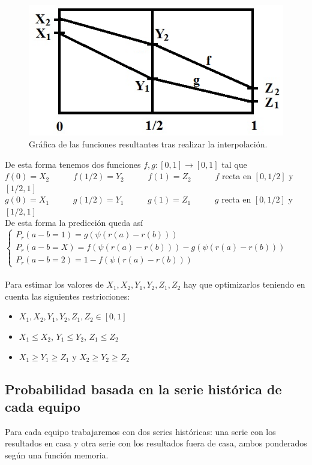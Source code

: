 \begin{figure}[htb]
	\centering
	\includegraphics{images/interpolar.png}
	\caption{Gráfica de las funciones resultantes tras realizar la interpolación.} \label{fig:interpolar}
\end{figure}

De esta forma tenemos dos funciones $f,g:[0,1] \longrightarrow [0,1]$ tal que\\
$f(0)= X_{2}$ \ \ \ \ \ $f(1/2)= Y_{2}$ \ \ \ \ \ $f(1)= Z_{2}$ \ \ \ \ \ $f$ recta en $[0,1/2]$ y $[1/2,1]$\\
$g(0)= X_{1}$ \ \ \ \ \ $g(1/2)= Y_{1}$ \ \ \ \ \ $g(1)= Z_{1}$ \ \ \ \ \ $g$ recta en $[0,1/2]$ y $[1/2,1]$\\

De esta forma la predicción queda así\\

$\begin{cases}
	P_{r}(a-b=1)=g(\psi (r(a)-r(b)))\\
	P_{r}(a-b=X)=f(\psi (r(a)-r(b)))-g(\psi (r(a)-r(b)))\\
	P_{r}(a-b=2)=1-f(\psi (r(a)-r(b)))
\end{cases}$
\ \\
\ \\
Para estimar los valores de $X_{1},X_{2},Y_{1},Y_{2},Z_{1},Z_{2}$ hay que optimizarlos teniendo en cuenta las siguientes restricciones:
\begin{itemize}
	\item $X_{1},X_{2},Y_{1},Y_{2},Z_{1},Z_{2} \in [0,1]$
	\item $X_{1} \leq X_{2}$, $Y_{1} \leq Y_{2}$, $Z_{1} \leq Z_{2}$
	\item $X_{1} \geq Y_{1} \geq Z_{1}$ y $X_{2} \geq Y_{2} \geq Z_{2}$	
\end{itemize}

\subsection{Probabilidad basada en la serie histórica de cada equipo}
Para cada equipo trabajaremos con dos series históricas: una serie con los resultados en casa y otra serie con los resultados fuera de casa, ambos ponderados según una función memoria.\\

